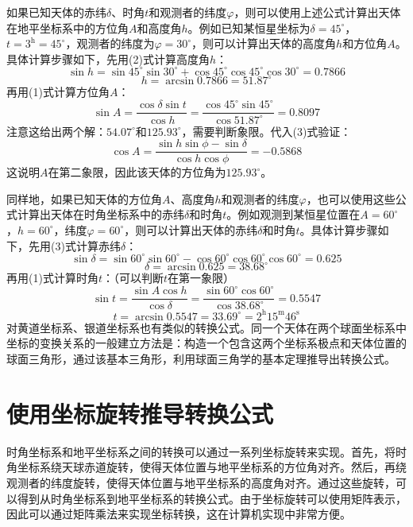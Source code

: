 \documentclass[a4paper]{article}
\begin{document}
如果已知天体的赤纬$\delta$、时角$t$和观测者的纬度$\varphi$，则可以使用上述公式计算出天体在地平坐标系中的方位角$A$和高度角$h$。例如已知某恒星坐标为$\delta = 45^\circ$，$t = 3^{\mathrm{h}} = 45^\circ$，观测者的纬度为$\varphi = 30^\circ$，则可以计算出天体的高度角$h$和方位角$A$。具体计算步骤如下，先用(2)式计算高度角$h$：
\[
    \sin{h} = \sin{45^\circ} \sin{30^\circ} + \cos{45^\circ} \cos{45^\circ} \cos{30^\circ} = 0.7866
\]
\[
    h = \arcsin{0.7866} = 51.87^\circ
\]
再用(1)式计算方位角$A$：
\[
    \sin{A} = \frac{\cos{\delta} \sin{t}}{\cos{h}} = \frac{\cos{45^\circ} \sin{45^\circ}}{\cos{51.87^\circ}} = 0.8097
\]
注意这给出两个解：$54.07^\circ$和$125.93^\circ$，需要判断象限。代入(3)式验证：
\[
    \cos{A} = \frac{\sin{h} \sin{\phi} - \sin{\delta}}{\cos{h} \cos{\phi}} = -0.5868
\]
这说明$A$在第二象限，因此该天体的方位角为$125.93^\circ$。

同样地，如果已知天体的方位角$A$、高度角$h$和观测者的纬度$\varphi$，也可以使用这些公式计算出天体在时角坐标系中的赤纬$\delta$和时角$t$。例如观测到某恒星位置在$A = 60^\circ$，$h = 60^\circ$，纬度$\varphi = 60^\circ$，则可以计算出天体的赤纬$\delta$和时角$t$。具体计算步骤如下，先用(3)式计算赤纬$\delta$：
\[
    \sin{\delta} = \sin{60^\circ} \sin{60^\circ} - \cos{60^\circ} \cos{60^\circ} \cos{60^\circ} = 0.625
\]
\[
    \delta = \arcsin{0.625} = 38.68^\circ
\]
再用(1)式计算时角$t$：（可以判断$t$在第一象限）
\[
    \sin{t} = \frac{\sin{A} \cos{h}}{\cos{\delta}} = \frac{\sin{60^\circ} \cos{60^\circ}}{\cos{38.68^\circ}} = 0.5547
\]
\[
    t = \arcsin{0.5547} = 33.69^\circ = 2^{\mathrm{h}} 15^{\mathrm{m}} 46^{\mathrm{s}}
\]
对黄道坐标系、银道坐标系也有类似的转换公式。同一个天体在两个球面坐标系中坐标的变换关系的一般建立方法是：构造一个包含这两个坐标系极点和天体位置的球面三角形，通过该基本三角形，利用球面三角学的基本定理推导出转换公式。

\section{使用坐标旋转推导转换公式}

时角坐标系和地平坐标系之间的转换可以通过一系列坐标旋转来实现。首先，将时角坐标系绕天球赤道旋转，使得天体位置与地平坐标系的方位角对齐。然后，再绕观测者的纬度旋转，使得天体位置与地平坐标系的高度角对齐。通过这些旋转，可以得到从时角坐标系到地平坐标系的转换公式。由于坐标旋转可以使用矩阵表示，因此可以通过矩阵乘法来实现坐标转换，这在计算机实现中非常方便。

\end{document}
